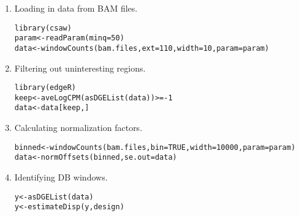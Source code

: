 \documentclass{report}\usepackage[]{graphicx}\usepackage[usenames,dvipsnames]{color}
\newcommand{\hlnum}[1]{\textcolor[rgb]{0.816,0.125,0.439}{#1}}%
\newcommand{\hlopt}[1]{\textcolor[rgb]{0,0,0}{#1}}%
\newcommand{\hlstd}[1]{\textcolor[rgb]{0.251,0.251,0.251}{#1}}%
\newcommand{\hlkwb}[1]{\textcolor[rgb]{0,0,0}{#1}}%
\newcommand{\hlkwc}[1]{\textcolor[rgb]{0.251,0.251,0.251}{#1}}%
\newcommand{\hlkwd}[1]{\textcolor[rgb]{0.878,0.439,0.125}{#1}}%
\newenvironment{knitrout}{}{} %
\begin{document}
\begin{enumerate}
\item Loading in data from BAM files.
\begin{knitrout}
\color{fgcolor}\begin{kframe}
\begin{alltt}
\hlkwd{library}\hlstd{(csaw)}
\hlstd{param} \hlkwb{<-} \hlkwd{readParam}\hlstd{(}\hlkwc{minq}\hlstd{=}\hlnum{50}\hlstd{)}
\hlstd{data} \hlkwb{<-} \hlkwd{windowCounts}\hlstd{(bam.files,} \hlkwc{ext}\hlstd{=}\hlnum{110}\hlstd{,} \hlkwc{width}\hlstd{=}\hlnum{10}\hlstd{,} \hlkwc{param}\hlstd{=param)}
\end{alltt}
\end{kframe}
\end{knitrout}
\item Filtering out uninteresting regions.
\begin{knitrout}
\color{fgcolor}\begin{kframe}
\begin{alltt}
\hlkwd{library}\hlstd{(edgeR)}
\hlstd{keep} \hlkwb{<-} \hlkwd{aveLogCPM}\hlstd{(}\hlkwd{asDGEList}\hlstd{(data))} \hlopt{>= -}\hlnum{1}
\hlstd{data} \hlkwb{<-} \hlstd{data[keep,]}
\end{alltt}
\end{kframe}
\end{knitrout}
\item Calculating normalization factors.
\begin{knitrout}
\color{fgcolor}\begin{kframe}
\begin{alltt}
\hlstd{binned} \hlkwb{<-} \hlkwd{windowCounts}\hlstd{(bam.files,} \hlkwc{bin}\hlstd{=}\hlnum{TRUE}\hlstd{,} \hlkwc{width}\hlstd{=}\hlnum{10000}\hlstd{,} \hlkwc{param}\hlstd{=param)}
\hlstd{data} \hlkwb{<-} \hlkwd{normOffsets}\hlstd{(binned,} \hlkwc{se.out}\hlstd{=data)}
\end{alltt}
\end{kframe}
\end{knitrout}
\item Identifying DB windows.
\begin{knitrout}
\color{fgcolor}\begin{kframe}
\begin{alltt}
\hlstd{y} \hlkwb{<-} \hlkwd{asDGEList}\hlstd{(data)}
\hlstd{y} \hlkwb{<-} \hlkwd{estimateDisp}\hlstd{(y, design)}

\end{alltt}
\end{kframe}
\end{knitrout}
\end{enumerate}
\end{document}
